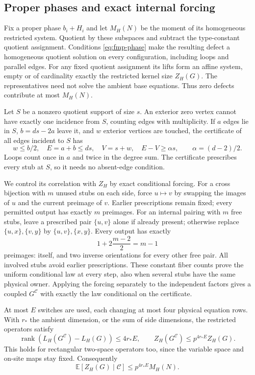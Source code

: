 \subsection{Proper phases and exact internal forcing}
Fix a proper phase $b_i+H_i$ and let $M_H(N)$ be the moment of its
homogeneous restricted system. Quotient by these subspaces and
subtract the type-constant quotient assignment. Conditions
\eqref{eq:fmp-phase} make the resulting defect a homogeneous quotient
solution on every configuration, including loops and parallel edges.
For any fixed quotient assignment its lifts form an affine system,
empty or of cardinality exactly the restricted kernel size $Z_H(G)$.
The representatives need not solve the ambient base equations. Thus
zero defects contribute at most $M_H(N)$.

Let $S$ be a nonzero quotient support of size $s$. An exterior zero
vertex cannot have exactly one incidence from $S$, counting edges
with multiplicity. If $a$ edges lie in $S$, $b=ds-2a$ leave it, and
$w$ exterior vertices are touched, the certificate of all edges
incident to $S$ has
\[
 w\le b/2,\quad E=a+b\le ds,\quad V=s+w,\quad
 E-V\ge\alpha s,\qquad \alpha=(d-2)/2.
\]
Loops count once in $a$ and twice in the degree sum. The certificate
prescribes every stub at $S$, so it needs no absent-edge condition.

We control its correlation with $Z_H$ by exact conditional forcing.
For a cross bijection with $m$ unused stubs on each side, force
$u\mapsto v$ by swapping the images of $u$ and the current preimage
of $v$. Earlier prescriptions remain fixed; every permitted output
has exactly $m$ preimages. For an internal pairing with $m$ free
stubs, leave a prescribed pair $\{u,v\}$ alone if already present;
otherwise replace $\{u,x\},\{v,y\}$ by $\{u,v\},\{x,y\}$.
Every output has exactly
\[
 1+2\frac{m-2}{2}=m-1
\]
preimages: itself, and two inverse orientations for every other free
pair. All involved stubs avoid earlier prescriptions. These constant
fiber counts prove the uniform conditional law at every step, also
when several stubs have the same physical owner. Applying the forcing
separately to the independent factors gives a coupled $G^{\mathcal C}$
with exactly the law conditional on the certificate.

At most $E$ switches are used, each changing at most four physical
equation rows. With $r_*$ the ambient dimension, or the sum of side
dimensions, the restricted operators satisfy
\[
 \operatorname{rank}(L_H(G^{\mathcal C})-L_H(G))\le4r_*E,
 \qquad Z_H(G^{\mathcal C})\le p^{4r_*E}Z_H(G).
\]
This holds for rectangular two-space operators too, since the
variable space and on-site maps stay fixed. Consequently
\begin{equation}\label{eq:fmp-conditional-kernel}
 \mathbb E[Z_H(G)\mid\mathcal C]\le p^{4r_*E}M_H(N).
\end{equation}

